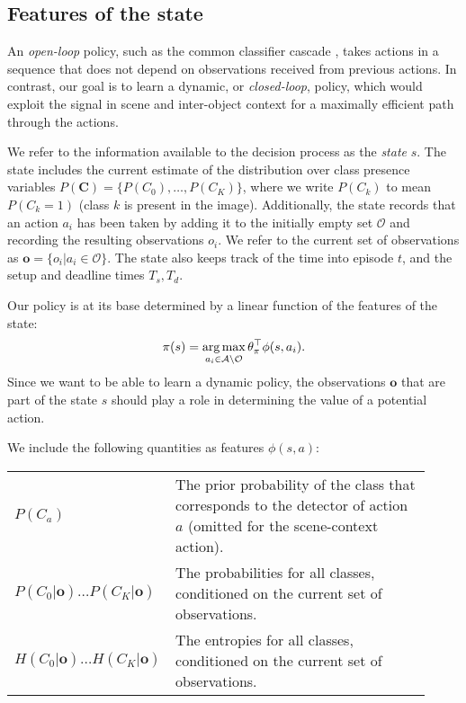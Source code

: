 \subsection{Features of the state}\label{sec:det_features}

An \emph{open-loop} policy, such as the common classifier cascade \cite{Viola2004}, takes actions in a sequence that does not depend on observations received from previous actions.
In contrast, our goal is to learn a dynamic, or \emph{closed-loop}, policy, which would exploit the signal in scene and inter-object context for a maximally efficient path through the actions.

We refer to the information available to the decision process as the \emph{state} $s$.
The state includes the current estimate of the distribution over class presence variables $P(\mathbf{C}) = \{P(C_0), \ldots, P(C_K)\}$, where we write $P(C_k)$ to mean $P(C_k=1)$ (class $k$ is present in the image).
Additionally, the state records that an action $a_i$ has been taken by adding it to the initially empty set $\mathcal{O}$ and recording the resulting observations $o_i$.
We refer to the current set of observations as $\mathbf{o} = \{o_i | a_i \in \mathcal{O}\}$.
The state also keeps track of the time into episode $t$, and the setup and deadline times $T_s,T_d$.

Our policy is at its base determined by a linear function of the features of the state:
\begin{align}
\pi(s) = \operatorname*{arg\,max}_{a_i \in \mathcal{A} \setminus \mathcal{O}} \theta_\pi^\top \phi(s,a_i).
\end{align}
Since we want to be able to learn a dynamic policy, the observations $\mathbf{o}$ that are part of the state $s$ should play a role in determining the value of a potential action.

We include the following quantities as features $\phi(s,a)$:
\begin{tabularx}{0.8\linewidth}{p{0.23\linewidth}p{0.69\linewidth}}
$P(C_a)$ & The prior probability of the class that corresponds to the detector of action $a$ (omitted for the scene-context action).\\
$P(C_0|\mathbf{o}) \ldots P(C_K|\mathbf{o})$ & The probabilities for all classes, conditioned on the current set of observations.\\
$H(C_0|\mathbf{o}) \ldots H(C_K|\mathbf{o})$ & The entropies for all classes, conditioned on the current set of observations. \\
\end{tabularx}

